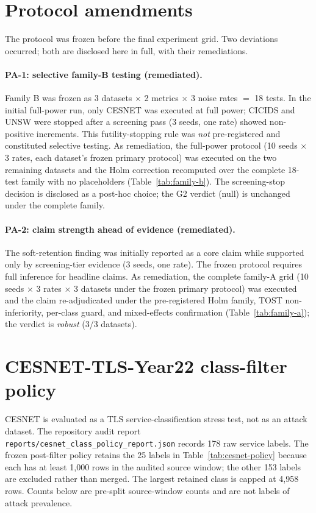 \documentclass[pdflatex,referee,lineno,sn-basic,Numbered]{sn-jnl}
\begin{document}
\begin{appendices}
\section{Protocol amendments}
\label{app:amendments}
The protocol was frozen before the final experiment grid. Two deviations
occurred; both are disclosed here in full, with their remediations.

\paragraph{PA-1: selective family-B testing (remediated).}
Family B was frozen as 3 datasets $\times$ 2 metrics $\times$ 3 noise rates
$=$ 18 tests. In the initial full-power run, only CESNET was executed at full
power; CICIDS and UNSW were stopped after a screening pass (3 seeds, one rate)
showed non-positive increments. This futility-stopping rule was \emph{not}
pre-registered and constituted selective testing. As remediation, the
full-power protocol (10 seeds $\times$ 3 rates, each dataset's frozen primary
protocol) was executed on the two remaining datasets and the Holm correction
recomputed over the complete 18-test family with no placeholders
(Table~\ref{tab:family-b}). The screening-stop decision is disclosed as a
post-hoc choice; the G2 verdict (null) is unchanged under the complete family.

\paragraph{PA-2: claim strength ahead of evidence (remediated).}
The soft-retention finding was initially reported as a core claim while
supported only by screening-tier evidence (3 seeds, one rate). The frozen
protocol requires full inference for headline claims. As remediation, the
complete family-A grid (10 seeds $\times$ 3 rates $\times$ 3 datasets under the
frozen primary protocol) was executed and the claim re-adjudicated under the
pre-registered Holm family, TOST non-inferiority, per-class guard, and
mixed-effects confirmation (Table~\ref{tab:family-a}); the verdict is
\emph{robust} (3/3 datasets).

\section{CESNET-TLS-Year22 class-filter policy}
\label{app:cesnet-policy}
\renewcommand{\thetable}{A\arabic{table}}
\renewcommand{\theHtable}{A.\arabic{table}}
CESNET is evaluated as a TLS service-classification stress test, not as an attack
dataset. The repository audit report
\texttt{reports/cesnet\_class\_policy\_report.json} records 178 raw service labels.
The frozen post-filter policy retains the 25 labels in Table~\ref{tab:cesnet-policy}
because each has at least 1,000 rows in the audited source window; the other 153
labels are excluded rather than merged. The largest retained class is capped at
4,958 rows. Counts below are pre-split source-window counts and are not labels of
attack prevalence.


\end{appendices}
\end{document}
